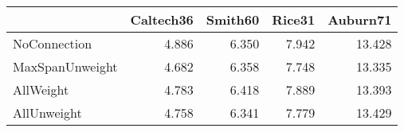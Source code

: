 \begin{tabular}{lrrrr}
\toprule
{} & Caltech36 & Smith60 & Rice31 & Auburn71 \\
\midrule
NoConnection    &     4.886 &   6.350 &  7.942 &   13.428 \\
MaxSpanUnweight &     4.682 &   6.358 &  7.748 &   13.335 \\
AllWeight       &     4.783 &   6.418 &  7.889 &   13.393 \\
AllUnweight     &     4.758 &   6.341 &  7.779 &   13.429 \\
\bottomrule
\end{tabular}
